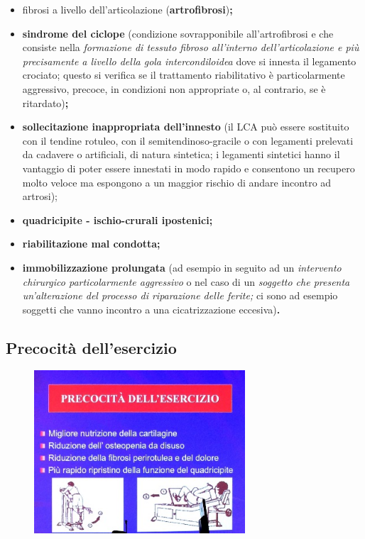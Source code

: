 \begin{itemize}
\item
  fibrosi a livello dell'articolazione (\textbf{artrofibrosi})\textbf{;}
\item
  \textbf{sindrome del ciclope} (condizione sovrapponibile
  all'artrofibrosi e che consiste nella \emph{formazione di tessuto
  fibroso all'interno dell'articolazione e più precisamente a livello
  della gola intercondiloidea} dove si innesta il legamento crociato;
  questo si verifica se il trattamento riabilitativo è particolarmente
  aggressivo, precoce, in condizioni non appropriate o, al contrario, se
  è ritardato)\textbf{;}
\item
  \textbf{sollecitazione inappropriata dell'innesto} (il LCA può essere
  sostituito con il tendine rotuleo, con il semitendinoso-gracile o con
  legamenti prelevati da cadavere o artificiali, di natura sintetica; i
  legamenti sintetici hanno il vantaggio di poter essere innestati in
  modo rapido e consentono un recupero molto veloce ma espongono a un
  maggior rischio di andare incontro ad artrosi);
\item
  \textbf{quadricipite - ischio-crurali ipostenici;}
\item
  \textbf{riabilitazione mal condotta;}
\item
  \textbf{immobilizzazione prolungata} (ad esempio in seguito ad un
  \emph{intervento chirurgico particolarmente aggressivo} o nel caso di
  un \emph{soggetto che presenta un'alterazione del processo di
  riparazione delle ferite;} ci sono ad esempio soggetti che vanno
  incontro a una cicatrizzazione eccesiva)\textbf{.}
\end{itemize}

\subsection{Precocità dell'esercizio}


\begin{figure}[!ht]
\centering
	\includegraphics[width=0.7\textwidth]{030/image3.jpeg}
\end{figure}

